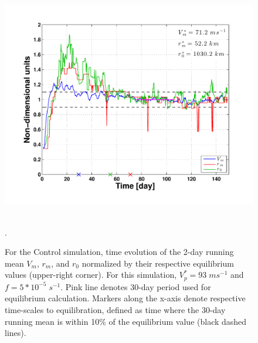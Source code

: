 \documentclass[12pt]{article}
\begin{document}
\begin{figure}[h!]
\centering
  \noindent\includegraphics[width=15cm,height=10cm]{FIGURES_TC_RCE_equilibrium_v2.0/Fig2_Control_run.pdf}
\caption{For the Control simulation, time evolution of the 2-day running mean $V_m$, $r_m$, and $r_0$ normalized by their respective equilibrium values (upper-right corner). For this simulation, $V^*_p =  93 \; ms^{-1}$ and $f = 5*10^{-5} \; s^{-1}$. Pink line denotes 30-day period used for equilibrium calculation. Markers along the x-axis denote respective time-scales to equilibration, defined as time where the 30-day running mean is within 10\% of the equilibrium value (black dashed lines).}
\label{fig:timeseries}.
\end{figure}
\end{document}
